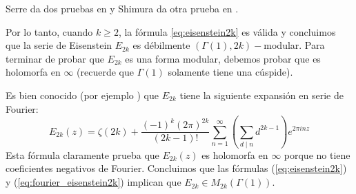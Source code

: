 \documentclass[../../tesis_maestria]{subfiles}
\begin{document}
 %

\begin{nota}
  Serre da dos pruebas en \cite[\S VII.2.2]{SerreACIA} y Shimura da otra prueba en
  \cite[\S III.8]{ShimuraMFBAB}.
\end{nota}

Por lo tanto, cuando $k\geq 2$, la f\'ormula \eqref{eq:eisenstein2k} es v\'alida y concluimos que
la serie de Eisenstein $E_{2k}$ es d\'ebilmente $(\Gamma(1),2k)-$modular. Para terminar de probar
que $E_{2k}$ es una forma modular, debemos probar que es holomorfa en $\infty$ (recuerde que
$\Gamma(1)$ solamente tiene una c\'uspide).

Es bien conocido (por ejemplo \cite[\S1.3, pg. 28]{BumpAFAR}) que $E_{2k}$ tiene la siguiente
expansi\'on en serie de Fourier:
\begin{equation}\label{eq:fourier_eisenstein2k}
  E_{2k}(z)=
  \zeta(2k)+\frac{(-1)^k(2\pi)^{2k}}{(2k-1)!}\sum_{n=1}^{\infty}\left(\sum_{d\mid n}d^{2k-1}\right)
  e^{2\pi inz}
\end{equation}
Esta f\'ormula claramente prueba que $E_{2k}(z)$ es holomorfa en $\infty$ porque no tiene
coeficientes negativos de Fourier. Concluimos que las f\'ormulas (\ref{eq:eisenstein2k}) y
(\ref{eq:fourier_eisenstein2k}) implican que $E_{2k}\in M_{2k}(\Gamma(1))$.
\end{document}
